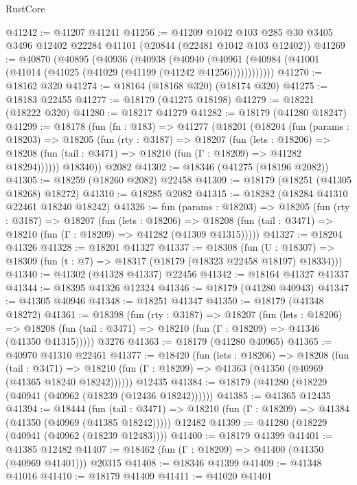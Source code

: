 \begin{lexlean}{RustCore}
\begin{coremodule}
@41242 := @41207 @41241
@41256 := @41209
    @1042
    @103
    @285
    @30
    @3405
    @3496
    @12402
    @22284
    @41101
    (@20844 (@22481 @1042 @103 @12402))
@41269 := @40870
    (@40895
      (@40936
        (@40938
          (@40940 (@40961 (@40984 (@41001 (@41014 (@41025 (@41029 (@41199 (@41242 @41256))))))))))))
@41270 := @18162 @320
@41274 := @18164 (@18168 @320) (@18174 @320)
@41275 := @18183 @22455
@41277 := @18179 (@41275 @18198)
@41279 := @18221 (@18222 @320)
@41280 := @18217 @41279
@41282 := @18179 (@41280 @18247)
@41299 := @18178
    (fun (fn : @183) =>
    @41277
      (@18201
        (@18204
          (fun (params : @18203) =>
          @18205
            (fun (rty : @3187) =>
            @18207
              (fun (lets : @18206) =>
              @18208 (fun (tail : @3471) => @18210 (fun (Γ : @18209) => @41282 @18294))))))
        @18340))
    @2082
@41302 := @18346 (@41275 (@18196 @2082))
@41305 := @18259 (@18260 @2082) @22458
@41309 := @18179 (@18251 (@41305 @18268) @18272)
@41310 := @18285 @2082
@41315 := @18282 (@18284 @41310 @22461 @18240 @18242)
@41326 := fun (params : @18203) =>
  @18205
    (fun (rty : @3187) =>
    @18207
      (fun (lets : @18206) =>
      @18208 (fun (tail : @3471) => @18210 (fun (Γ : @18209) => @41282 (@41309 @41315)))))
@41327 := @18204 @41326
@41328 := @18201 @41327
@41337 := @18308
    (fun (U : @18307) => @18309 (fun (t : @7) => @18317 (@18179 (@18323 @22458 @18197) @18334)))
@41340 := @41302 (@41328 @41337) @22456
@41342 := @18164 @41327 @41337
@41344 := @18395 @41326 @12324
@41346 := @18179 (@41280 @40943)
@41347 := @41305 @40946
@41348 := @18251 @41347
@41350 := @18179 (@41348 @18272)
@41361 := @18398
    (fun (rty : @3187) =>
    @18207
      (fun (lets : @18206) =>
      @18208 (fun (tail : @3471) => @18210 (fun (Γ : @18209) => @41346 (@41350 @41315)))))
    @3276
@41363 := @18179 (@41280 @40965)
@41365 := @40970 @41310 @22461
@41377 := @18420
    (fun (lets : @18206) =>
    @18208
      (fun (tail : @3471) =>
      @18210 (fun (Γ : @18209) => @41363 (@41350 (@40969 (@41365 @18240 @18242))))))
    @12435
@41384 := @18179 (@41280 (@18229 (@40941 (@40962 (@18239 (@12436 @18242))))))
@41385 := @41365 @12435
@41394 := @18444
    (fun (tail : @3471) => @18210 (fun (Γ : @18209) => @41384 (@41350 (@40969 (@41385 @18242)))))
    @12482
@41399 := @41280 (@18229 (@40941 (@40962 (@18239 @12483))))
@41400 := @18179 @41399
@41401 := @41385 @12482
@41407 := @18462 (fun (Γ : @18209) => @41400 (@41350 (@40969 @41401))) @20315
@41408 := @18346 @41399
@41409 := @41348 @41016
@41410 := @18179 @41409
@41411 := @41020 @41401

\end{coremodule}
\end{lexlean}
